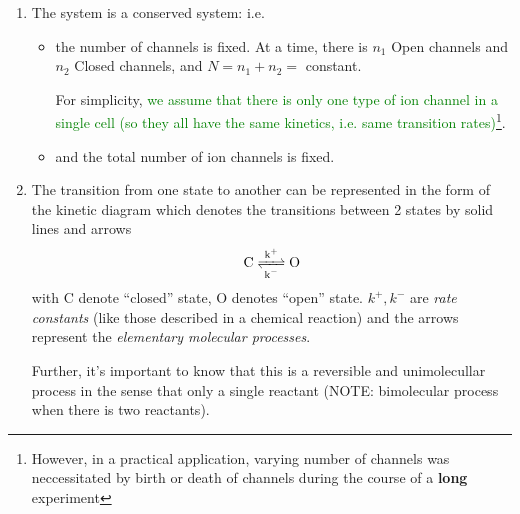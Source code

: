 \begin{enumerate}
  
  \item The system is a conserved system: i.e. 
  
  \begin{itemize}
  
    \item the number of channels is fixed. At a time, there is $n_1$ Open
    channels and $n_2$ Closed channels, and $N=n_1+n_2 =$ constant.

For simplicity, \textcolor{green}{we assume that there is only one type of ion
channel in a single cell (so they all have the same kinetics, i.e.
same transition rates)}\footnote{However, in a practical application, varying
number of channels was neccessitated by birth or death of channels during the
course of a {\bf long} experiment}.
  
    \item and the total number of ion channels is fixed.
  \end{itemize}
  
  \item The transition from one state to another can be represented in the form
  of the kinetic diagram which denotes the transitions between 2 states by solid
  lines and arrows
  \begin{equation}
    \label{eq:7}
    \ce{C <=>[k^+][k^-] O}
  \end{equation}
  with C denote ``closed'' state, O denotes ``open'' state.  $k^+,
  k^-$ are {\it rate constants} (like those described in a chemical
  reaction) and the arrows represent the
  {\it elementary molecular processes}.

  Further, it's important to know that this is a reversible and
  unimolecullar process in the sense that only a single reactant
  (NOTE: bimolecular process when there is two reactants). 

\end{enumerate}


